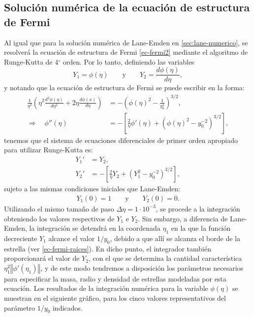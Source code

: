 \subsection{Solución numérica de la ecuación de estructura de Fermi}\label{sec:fermi-numerico}
Al igual que para la solución numérica de Lane-Emden en \ref{sec:lane-numerico}, se resolverá la ecuación de estructura de Fermi \eqref{ec-fermi2} mediante el algoritmo de Runge-Kutta de 4${}^{\circ}$ orden. Por lo tanto, definiendo las variables
\begin{equation}
 Y_1=\phi(\eta)\qquad\text{y}\qquad Y_2=\frac{d\phi(\eta)}{d\eta},
\end{equation}
y notando que la ecuación de estructura de Fermi se puede escribir en la forma:
\begin{align}
\frac{1}{\eta^2}\left(\eta^2\frac{d^2\phi(\eta)}{d\eta^2}+2\eta
\frac{d\phi(x)}{d\eta}\right)&=-\left(\phi(\eta)^2-\frac{1}{y_0^2}\right)^{3/2},\\
\Rightarrow\quad \phi''(\eta)&=-\left[\frac{2}{\eta}\phi'(\eta)+\left(\phi(\eta)^2-y_0^{-2}\right)^{3/2}\right],\label{ec-fermi-phi''}
\end{align}
tenemos que el sistema de ecuaciones diferenciales de primer orden apropiado para utilizar Runge-Kutta es:
\begin{equation}
\boxed{
\begin{aligned}
 Y_1'&=Y_2,\\
Y_2'&=-\left[\frac{2}{\eta}Y_2+\left(Y_1^2-y_0^{-2}\right)^{3/2}\right],
\end{aligned}}
\end{equation}
sujeto a las mismas condiciones iniciales que Lane-Emden:
\begin{align}
 Y_1(0)=1\qquad\text{y}\qquad Y_2(0)=0.
\end{align}
Utilizando el mismo tama\~no de paso $\Delta\eta=1\cdot 10^{-3}$, se procede a la integración obteniendo los valores respectivos de $Y_1$ e $Y_2$. Sin embargo, a diferencia de Lane-Emden, la integración se detendrá en la coordenada $\eta_1$ en la que la función decreciente $Y_1$ alcance el valor $1/y_0$, debido a que allí se alcanza el borde de la estrella (ver \eqref{ec-fermi-raices}). En dicho punto, el integrador también proporcionará el valor de $Y_2$, con el que se determina la cantidad característica $\eta_1^2\left\Vert\phi'(\eta_1)\right\Vert$, y de este modo tendremos a disposición los parámetros necesarios para especificar la masa, radio y densidad de estrellas modeladas por esta ecuación. Los resultados de la integración numérica para la variable $\phi(\eta)$ se muestran en el siguiente gráfico, para los cinco valores representativos del parámetro $1/y_0$ indicados.

